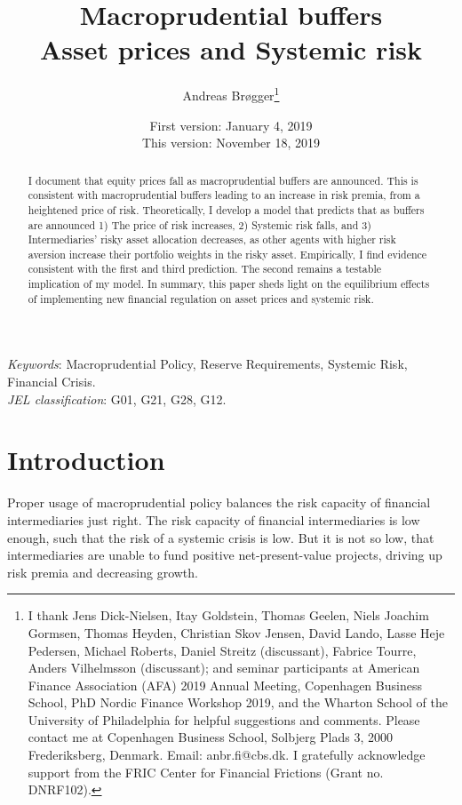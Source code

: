 \documentclass[11pt]{article}
\title{\Huge Macroprudential buffers\\ \huge{Asset prices and Systemic risk}}
\author{\Large Andreas Br\o gger\thanks{
\small
I thank Jens Dick-Nielsen, Itay Goldstein, Thomas Geelen, Niels Joachim Gormsen, Thomas Heyden, Christian Skov Jensen, David Lando, Lasse Heje Pedersen, Michael Roberts, Daniel Streitz (discussant), Fabrice Tourre, Anders Vilhelmsson (discussant); and seminar participants at American Finance Association (AFA) 2019 Annual Meeting, Copenhagen Business School, PhD Nordic Finance Workshop 2019, and the Wharton School of the University of Philadelphia for helpful suggestions and comments. Please contact me at Copenhagen Business School, Solbjerg Plads 3, 2000 Frederiksberg, Denmark.
Email: anbr.fi@cbs.dk.
I gratefully acknowledge support from the FRIC Center for Financial Frictions (Grant no. DNRF102).}
}
\date{\Large First version: January 4, 2019\\This version: %
November 18, 2019
}
\begin{document}
\maketitle

\begin{abstract}
\noindent I document that equity prices fall as macroprudential buffers are announced. This is consistent with macroprudential buffers leading to an increase in risk premia, from a heightened price of risk. Theoretically, I develop a model that predicts that as buffers are announced 1) The price of risk increases, 2) Systemic risk falls, and 3) Intermediaries' risky asset allocation decreases, as other agents with higher risk aversion increase their portfolio weights in the risky asset. Empirically, I find evidence consistent with the first and third prediction. The second remains a testable implication of my model. In summary, this paper sheds light on the equilibrium effects of implementing new financial regulation on asset prices and systemic risk.
\end{abstract}

\noindent \textit{Keywords}: Macroprudential Policy, Reserve Requirements, Systemic Risk, Financial Crisis.\\
\noindent \textit{JEL classification}: G01, G21, G28, G12.

\clearpage
\renewcommand{\thefootnote}{\arabic{footnote}}


\section*{Introduction}
Proper usage of macroprudential policy balances the risk capacity of financial intermediaries just right. The risk capacity of financial intermediaries is low enough, such that the risk of a systemic crisis is low. But it is not so low, that intermediaries are unable to fund positive net-present-value projects, driving up risk premia and decreasing growth.
\end{document}
